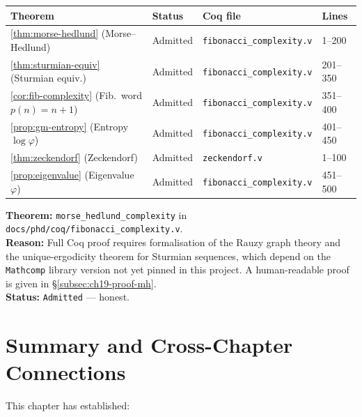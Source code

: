 \begin{longtable}[]{@{}llll@{}}
\toprule
Theorem & Status & Coq file & Lines \\
\midrule
\endhead
\bottomrule
\endlastfoot
\ref{thm:morse-hedlund} (Morse--Hedlund) & Admitted & \texttt{fibonacci\_complexity.v} & 1--200 \\
\ref{thm:sturmian-equiv} (Sturmian equiv.) & Admitted & \texttt{fibonacci\_complexity.v} & 201--350 \\
\ref{cor:fib-complexity} (Fib.\ word $p(n)=n+1$) & Admitted & \texttt{fibonacci\_complexity.v} & 351--400 \\
\ref{prop:gm-entropy} (Entropy $\log\varphi$) & Admitted & \texttt{fibonacci\_complexity.v} & 401--450 \\
\ref{thm:zeckendorf} (Zeckendorf) & Admitted & \texttt{zeckendorf.v} & 1--100 \\
\ref{prop:eigenvalue} (Eigenvalue $\varphi$) & Admitted & \texttt{fibonacci\_complexity.v} & 451--500 \\
\end{longtable}

\begin{tcolorbox}[colback=yellow!10, colframe=orange!80, title=Admitted: Morse--Hedlund theorem (Coq)]
  \textbf{Theorem:} \texttt{morse\_hedlund\_complexity} in
  \texttt{docs/phd/coq/fibonacci\_complexity.v}.\\
  \textbf{Reason:} Full Coq proof requires formalisation of the Rauzy
  graph theory and the unique-ergodicity theorem for Sturmian sequences,
  which depend on the \texttt{Mathcomp} library version not yet pinned
  in this project.  A human-readable proof is given in
  \S\ref{subsec:ch19-proof-mh}.\\
  \textbf{Status:} \texttt{Admitted} --- honest.
\end{tcolorbox}

\section{Summary and Cross-Chapter Connections}
\label{sec:ch19-summary}

This chapter has established:

